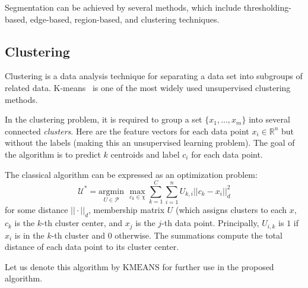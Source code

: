 \documentclass[graybox]{svmult}
\begin{document}

Segmentation can be achieved by several methods, which include thresholding-based, edge-based, region-based, and clustering techniques.

\subsection{Clustering}

Clustering is a data analysis technique for separating a data set into subgroups of related data. K-means~\cite{kmeans} is one of the most widely used unsupervised clustering methods.

In the clustering problem, it is required to group  a set $\{x_1, \ldots, x_m \}$ into several connected \emph{clusters}. Here are the feature vectors for each data point $x_i \in \mathbb{R}^n$ but without the labels  (making this an unsupervised learning problem).
The goal of the algorithm is to predict $k$ centroids and label $c_i$ for each data point.

The classical algorithm can be expressed as an optimization problem:
$$
\mathcal{U}^* =
\underset{U\in\mathcal{P}}{\mathrm{argmin}} ~\,\max_{c_k\in\chi} 
\sum_{k=1}^C \sum_{i=1}^n
U_{k,i} ||c_k - x_i||_d^2
$$
for some distance $||\cdot||_d$, membership matrix $U$ (which assigns clusters to each $x$, $c_k$ is the $k$-th cluster center, and $x_j$ is the $j$-th data point. Principally, $U_{i,k}$ is $1$ if $x_i$ is in the $k$-th cluster and $0$ otherwise. The summations compute the total distance of each data point to its cluster center.

Let us denote this algorithm by $\mathrm{KMEANS}$ for further use in the proposed algorithm.
\end{document}
